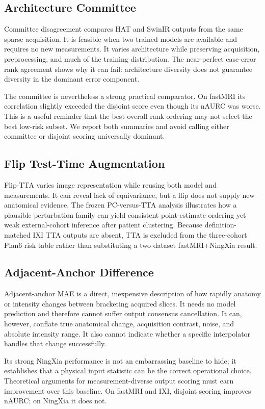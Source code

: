 \documentclass[journal,10pt]{IEEEtran}
\begin{document}
\subsection{Architecture Committee}
Committee disagreement compares HAT and SwinIR outputs from the same sparse acquisition. It is feasible when two trained models are available and requires no new measurements. It varies architecture while preserving acquisition, preprocessing, and much of the training distribution. The near-perfect case-error rank agreement shows why it can fail: architecture diversity does not guarantee diversity in the dominant error component.

The committee is nevertheless a strong practical comparator. On fastMRI its correlation slightly exceeded the disjoint score even though its nAURC was worse. This is a useful reminder that the best overall rank ordering may not select the best low-risk subset. We report both summaries and avoid calling either committee or disjoint scoring universally dominant.

\subsection{Flip Test-Time Augmentation}
Flip-TTA varies image representation while reusing both model and measurements. It can reveal lack of equivariance, but a flip does not supply new anatomical evidence. The frozen PC-versus-TTA analysis illustrates how a plausible perturbation family can yield consistent point-estimate ordering yet weak external-cohort inference after patient clustering. Because definition-matched IXI TTA outputs are absent, TTA is excluded from the three-cohort Plan6 risk table rather than substituting a two-dataset fastMRI+NingXia result.

\subsection{Adjacent-Anchor Difference}
Adjacent-anchor MAE is a direct, inexpensive description of how rapidly anatomy or intensity changes between bracketing acquired slices. It needs no model prediction and therefore cannot suffer output consensus cancellation. It can, however, conflate true anatomical change, acquisition contrast, noise, and absolute intensity range. It also cannot indicate whether a specific interpolator handles that change successfully.

Its strong NingXia performance is not an embarrassing baseline to hide; it establishes that a physical input statistic can be the correct operational choice. Theoretical arguments for measurement-diverse output scoring must earn improvement over this baseline. On fastMRI and IXI, disjoint scoring improves nAURC; on NingXia it does not.
\end{document}
